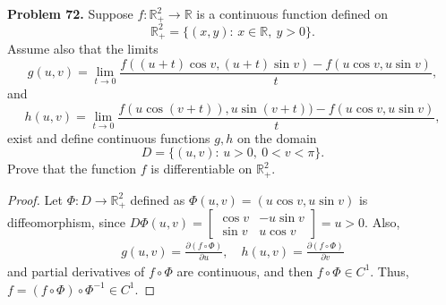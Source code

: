 \documentclass[11pt]{article}
\theoremstyle{definition}
\theoremstyle{definition}
\begin{document}
\noindent
{\bf Problem 72.}
Suppose $f:\mathbb{R}^2_+\to\mathbb{R}$ is a continuous function defined on
$$
\mathbb{R}^2_+=\{(x,y):\, x\in\mathbb{R},\ y>0\}.
$$
Assume also that the limits
$$
g(u,v)=\lim_{t\to 0}\frac{f((u+t)\cos v,(u+t)\sin v)-f(u\cos v,u\sin v)}{t},
$$
and
$$
h(u,v)=\lim_{t\to 0}\frac{f(u\cos (v+t)),u\sin (v+t))-f(u\cos v,u\sin v)}{t},
$$
exist and define continuous functions $g,h$ on the domain
$$
D=\{(u,v):\, u>0,\ 0<v<\pi\}.
$$
Prove that the function $f$ is differentiable on $\mathbb{R}^2_+$.
\begin{proof}
Let $\Phi: D \to \mathbb{R}^2_+$ defined as $\Phi(u,v) = (u \cos v, u \sin v)$ is diffeomorphism, since $D\Phi(u,v) = \begin{bmatrix} \cos v & -u \sin v \\ \sin v & u \cos v \end{bmatrix} = u > 0$. Also,
\begin{align*}
    g(u,v) = \frac{\partial (f \circ \Phi)}{\partial u}, \quad h(u,v) = \frac{\partial (f \circ \Phi)}{\partial v}
\end{align*}
and partial derivatives of $f \circ \Phi$ are continuous, and then $f \circ \Phi \in C^1$. Thus, $f = (f \circ \Phi) \circ \Phi^{-1} \in C^1$.
\end{proof}


\medskip
\end{document}

